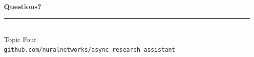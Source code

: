 \documentclass[aspectratio=169,11pt]{beamer}
\newcommand{\teamname}{Topic Four}
\newcommand{\repolink}{github.com/nuralnetworks/async-research-assistant}
\begin{document}
{%
\begin{frame}[plain]
  \begin{center}
    \vspace{1cm}
    {\Huge\bfseries\color{accent} Questions?}\\[1.2em]
    \rule{0.5\textwidth}{0.6pt}\\[1.2em]
    {\large \teamname}\\[0.6em]
    {\normalsize \texttt{\repolink}}
  \end{center}
\end{frame}
}
\end{document}
